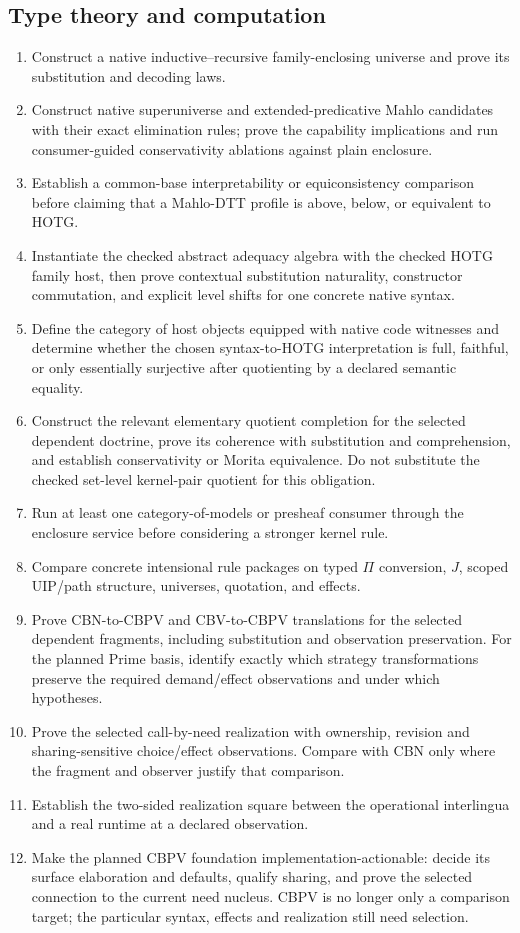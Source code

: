 \documentclass[11pt]{article}
\theoremstyle{definition}
\theoremstyle{remark}
\begin{document}
\subsection{Type theory and computation}

\begin{enumerate}
\item Construct a native inductive--recursive family-enclosing universe and
  prove its substitution and decoding laws.
\item Construct native superuniverse and extended-predicative Mahlo candidates
  with their exact elimination rules; prove the capability implications and run
  consumer-guided conservativity ablations against plain enclosure.
\item Establish a common-base interpretability or equiconsistency comparison
  before claiming that a Mahlo-DTT profile is above, below, or equivalent to
  HOTG.
\item Instantiate the checked abstract adequacy algebra with the checked HOTG
  family host, then prove contextual substitution naturality, constructor
  commutation, and explicit level shifts for one concrete native syntax.
\item Define the category of host objects equipped with native code witnesses
  and determine whether the chosen syntax-to-HOTG interpretation is full,
  faithful, or only essentially
  surjective after quotienting by a declared semantic equality.
\item Construct the relevant elementary quotient completion for the selected
  dependent doctrine, prove its coherence with substitution and comprehension,
  and establish conservativity or Morita equivalence.  Do not substitute the checked
  set-level kernel-pair quotient for this obligation.
\item Run at least one category-of-models or presheaf consumer through the
  enclosure service before considering a stronger kernel rule.
\item Compare concrete intensional rule packages on typed $\Pi$ conversion,
  $J$, scoped UIP/path structure, universes, quotation, and effects.
\item Prove CBN-to-CBPV and CBV-to-CBPV translations for the selected dependent
  fragments, including substitution and observation preservation. For the
  planned Prime basis, identify exactly which strategy transformations preserve
  the required demand/effect observations and under which hypotheses.
\item Prove the selected call-by-need realization with ownership, revision and
  sharing-sensitive choice/effect observations. Compare with CBN only where
  the fragment and observer justify that comparison.
\item Establish the two-sided realization square between the operational
  interlingua and a real runtime at a declared observation.
\item Make the planned CBPV foundation implementation-actionable: decide its
  surface elaboration and defaults, qualify sharing, and prove the selected
  connection to the current need nucleus. CBPV is no longer only a comparison
  target; the particular syntax, effects and realization still need selection.
\end{enumerate}
\end{document}
